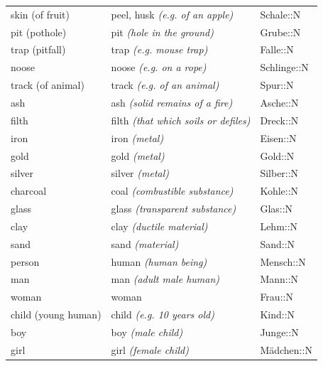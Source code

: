 \begin{center}
\begin{longtable}{lll}
{\sc \lowercase{	SKIN \footnotesize (OF FRUIT)	}}	&	peel, husk	\textit{\footnotesize (e.g. of an apple)}	&	Schale::N	\\
{\sc \lowercase{	PIT \footnotesize (POTHOLE)	}}	&	pit	\textit{\footnotesize (hole in the ground)}	&	Grube::N	\\
{\sc \lowercase{	TRAP \footnotesize (PITFALL)	}}	&	trap	\textit{\footnotesize (e.g. mouse trap)}	&	Falle::N	\\
{\sc \lowercase{	NOOSE	}}	&	noose	\textit{\footnotesize (e.g. on a rope)}	&	Schlinge::N	\\
{\sc \lowercase{	TRACK \footnotesize (OF ANIMAL)	}}	&	track	\textit{\footnotesize (e.g. of an animal)}	&	Spur::N	\\
{\sc \lowercase{	ASH	}}	&	ash	\textit{\footnotesize (solid remains of a fire)}	&	Asche::N	\\
{\sc \lowercase{	FILTH	}}	&	filth	\textit{\footnotesize (that which soils or defiles)}	&	Dreck::N	\\
{\sc \lowercase{	IRON	}}	&	iron	\textit{\footnotesize (metal)}	&	Eisen::N	\\
{\sc \lowercase{	GOLD	}}	&	gold	\textit{\footnotesize (metal)}	&	Gold::N	\\
{\sc \lowercase{	SILVER	}}	&	silver	\textit{\footnotesize (metal)}	&	Silber::N	\\
{\sc \lowercase{	CHARCOAL	}}	&	coal	\textit{\footnotesize (combustible substance)}	&	Kohle::N	\\
{\sc \lowercase{	GLASS	}}	&	glass	\textit{\footnotesize (transparent substance)}	&	Glas::N	\\
{\sc \lowercase{	CLAY	}}	&	clay	\textit{\footnotesize (ductile material)}	&	Lehm::N	\\
{\sc \lowercase{	SAND	}}	&	sand	\textit{\footnotesize (material)}	&	Sand::N	\\
{\sc \lowercase{	PERSON	}}	&	human	\textit{\footnotesize (human being)}	&	Mensch::N	\\
{\sc \lowercase{	MAN	}}	&	man	\textit{\footnotesize (adult male human)}	&	Mann::N	\\
{\sc \lowercase{	WOMAN	}}	&	woman		&	Frau::N	\\
{\sc \lowercase{	CHILD \footnotesize (YOUNG HUMAN)	}}	&	child	\textit{\footnotesize (e.g. 10 years old)}	&	Kind::N	\\
{\sc \lowercase{	BOY	}}	&	boy	\textit{\footnotesize (male child)}	&	Junge::N	\\
{\sc \lowercase{	GIRL	}}	&	girl	\textit{\footnotesize (female child)}	&	Mädchen::N	\\

\end{longtable}
\end{center}

